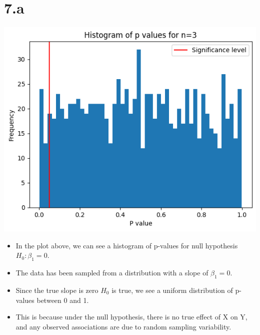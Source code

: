 \documentclass[12pt]{article}
\begin{document}
\section*{7.a}
\includegraphics*[width=\linewidth]{graph7a}
\begin{itemize}
    \item In the plot above, we can see a histogram of p-values for null
    hypothesis \(H_0: \beta_1 = 0\).
    \item The data has been sampled from a distribution with a slope of \(\beta_1 = 0\).
    \item Since the true slope is zero \(H_0\) is true, we see a uniform distribution
    of p-values between 0 and 1.
    \item This is because under the null hypothesis, there is no true effect of X on Y,
    and any observed associations are due to random sampling variability.
\end{itemize}

\newpage
\end{document}
